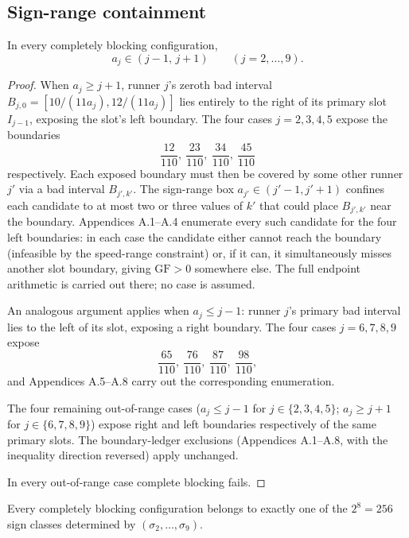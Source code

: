 \documentclass[12pt]{article}
\begin{document}
\subsection{Sign-range containment}

\begin{lemma}\label{l:51}
In every completely blocking configuration,
\[
a_j \in (j-1,\,j+1)\qquad(j=2,\ldots,9).
\]

\end{lemma}
\begin{proof}
When $a_j\ge j+1$, runner $j$'s zeroth bad interval $B_{j,0}=[10/(11a_j),12/(11a_j)]$
lies entirely to the right of its primary slot $I_{j-1}$, exposing the slot's left
boundary. The four cases $j=2,3,4,5$ expose the boundaries
\[
\frac{12}{110},\ \frac{23}{110},\ \frac{34}{110},\ \frac{45}{110}
\]
respectively. Each exposed boundary must then be covered by some other runner $j'$ via a
bad interval $B_{j',k'}$. The sign-range box $a_{j'}\in(j'-1,j'+1)$ confines each
candidate to at most two or three values of $k'$ that could place $B_{j',k'}$ near the
boundary. Appendices A.1--A.4 enumerate every such candidate for the four left boundaries:
in each case the candidate either cannot reach the boundary (infeasible by the speed-range
constraint) or, if it can, it simultaneously misses another slot boundary, giving
$\mathrm{GF}>0$ somewhere else. The full endpoint arithmetic is carried out there; no case
is assumed.

An analogous argument applies when $a_j\le j-1$: runner $j$'s primary bad interval lies
to the left of its slot, exposing a right boundary. The four cases $j=6,7,8,9$ expose
\[
\frac{65}{110},\ \frac{76}{110},\ \frac{87}{110},\ \frac{98}{110},
\]
and Appendices A.5--A.8 carry out the corresponding enumeration.

The four remaining out-of-range cases ($a_j\le j-1$ for $j\in\{2,3,4,5\}$;
$a_j\ge j+1$ for $j\in\{6,7,8,9\}$) expose right and left boundaries respectively
of the same primary slots. The boundary-ledger exclusions (Appendices A.1--A.8, with
the inequality direction reversed) apply unchanged.

In every out-of-range case complete blocking fails.
\end{proof}

\begin{corollary}\label{c:51}
Every completely blocking configuration belongs to exactly one of the
$2^8=256$ sign classes determined by $(\sigma_2,\ldots,\sigma_9)$.
\end{corollary}
\end{document}
